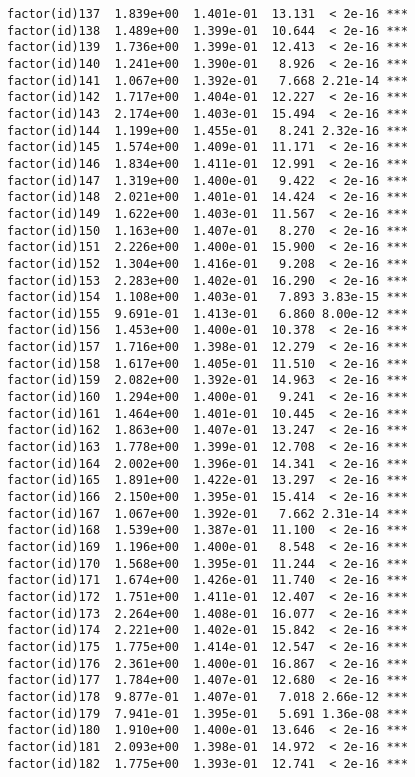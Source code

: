 \documentclass[]{article}
\begin{document}
\begin{verbatim}
factor(id)137  1.839e+00  1.401e-01  13.131  < 2e-16 ***
factor(id)138  1.489e+00  1.399e-01  10.644  < 2e-16 ***
factor(id)139  1.736e+00  1.399e-01  12.413  < 2e-16 ***
factor(id)140  1.241e+00  1.390e-01   8.926  < 2e-16 ***
factor(id)141  1.067e+00  1.392e-01   7.668 2.21e-14 ***
factor(id)142  1.717e+00  1.404e-01  12.227  < 2e-16 ***
factor(id)143  2.174e+00  1.403e-01  15.494  < 2e-16 ***
factor(id)144  1.199e+00  1.455e-01   8.241 2.32e-16 ***
factor(id)145  1.574e+00  1.409e-01  11.171  < 2e-16 ***
factor(id)146  1.834e+00  1.411e-01  12.991  < 2e-16 ***
factor(id)147  1.319e+00  1.400e-01   9.422  < 2e-16 ***
factor(id)148  2.021e+00  1.401e-01  14.424  < 2e-16 ***
factor(id)149  1.622e+00  1.403e-01  11.567  < 2e-16 ***
factor(id)150  1.163e+00  1.407e-01   8.270  < 2e-16 ***
factor(id)151  2.226e+00  1.400e-01  15.900  < 2e-16 ***
factor(id)152  1.304e+00  1.416e-01   9.208  < 2e-16 ***
factor(id)153  2.283e+00  1.402e-01  16.290  < 2e-16 ***
factor(id)154  1.108e+00  1.403e-01   7.893 3.83e-15 ***
factor(id)155  9.691e-01  1.413e-01   6.860 8.00e-12 ***
factor(id)156  1.453e+00  1.400e-01  10.378  < 2e-16 ***
factor(id)157  1.716e+00  1.398e-01  12.279  < 2e-16 ***
factor(id)158  1.617e+00  1.405e-01  11.510  < 2e-16 ***
factor(id)159  2.082e+00  1.392e-01  14.963  < 2e-16 ***
factor(id)160  1.294e+00  1.400e-01   9.241  < 2e-16 ***
factor(id)161  1.464e+00  1.401e-01  10.445  < 2e-16 ***
factor(id)162  1.863e+00  1.407e-01  13.247  < 2e-16 ***
factor(id)163  1.778e+00  1.399e-01  12.708  < 2e-16 ***
factor(id)164  2.002e+00  1.396e-01  14.341  < 2e-16 ***
factor(id)165  1.891e+00  1.422e-01  13.297  < 2e-16 ***
factor(id)166  2.150e+00  1.395e-01  15.414  < 2e-16 ***
factor(id)167  1.067e+00  1.392e-01   7.662 2.31e-14 ***
factor(id)168  1.539e+00  1.387e-01  11.100  < 2e-16 ***
factor(id)169  1.196e+00  1.400e-01   8.548  < 2e-16 ***
factor(id)170  1.568e+00  1.395e-01  11.244  < 2e-16 ***
factor(id)171  1.674e+00  1.426e-01  11.740  < 2e-16 ***
factor(id)172  1.751e+00  1.411e-01  12.407  < 2e-16 ***
factor(id)173  2.264e+00  1.408e-01  16.077  < 2e-16 ***
factor(id)174  2.221e+00  1.402e-01  15.842  < 2e-16 ***
factor(id)175  1.775e+00  1.414e-01  12.547  < 2e-16 ***
factor(id)176  2.361e+00  1.400e-01  16.867  < 2e-16 ***
factor(id)177  1.784e+00  1.407e-01  12.680  < 2e-16 ***
factor(id)178  9.877e-01  1.407e-01   7.018 2.66e-12 ***
factor(id)179  7.941e-01  1.395e-01   5.691 1.36e-08 ***
factor(id)180  1.910e+00  1.400e-01  13.646  < 2e-16 ***
factor(id)181  2.093e+00  1.398e-01  14.972  < 2e-16 ***
factor(id)182  1.775e+00  1.393e-01  12.741  < 2e-16 ***

\end{verbatim}
\end{document}
